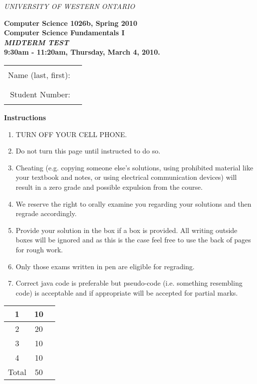 \documentclass[12pt]{report}
\begin{document}
{\large
\begin{center}
{\it UNIVERSITY OF WESTERN ONTARIO}
\end{center}
\begin{center}
\bf{Computer Science 1026b, Spring 2010}\\
\large{\bf{Computer Science Fundamentals I}}\\
{\large{\it MIDTERM TEST }}\\
9:30am - 11:20am, Thursday, March 4, 2010.
\end{center}

\begin{center}
\begin{tabular}{ r c}
Name (last, first): & \rule{2in}{0.01in} \\
Student Number: & \rule{2in}{0.01in}
\end{tabular}
\end{center}

{\normalsize
\vspace{20pt}
\begin{center}\textbf{Instructions}\end{center}
\begin{enumerate}
\item TURN OFF YOUR CELL PHONE.
\item Do not turn this page until instructed to do so.
\item Cheating (e.g. copying someone else's solutions, using prohibited material like your textbook and notes, 
or using electrical communication devices) will result in a zero grade and possible expulsion from the course.
\item We reserve the right to orally examine you regarding your solutions and then regrade accordingly.
\item Provide your solution in the box if a box is provided. All writing outside boxes will be ignored and as this is the case feel free to use the back of pages for rough work.
\item Only those exams written in pen are eligible for regrading.
\item Correct java code is preferable but pseudo-code (i.e. something resembling code) is 
acceptable and if appropriate will be accepted for partial marks.
\end{enumerate}
\vspace{30pt}
}

\begin{center}
{\Large
\begin{tabular}{||c|c|r||} \hline 
 1 & 10 &\hspace{10mm} \hfill \\ \hline 
 2 & 20 &       \\ \hline
 3 & 10 &      \\ \hline
4 &  10 &    \\ \hline
Total & 50 & \\ \hline 
\end{tabular}
}
\end{center}
}
\clearpage
\end{document}
